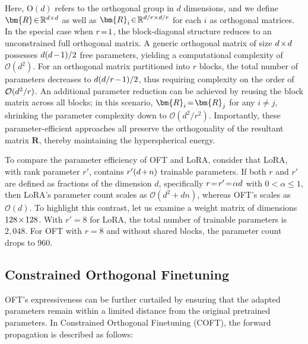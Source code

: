 Here, $\text{O}(d)$ refers to the orthogonal group in $d$ dimensions, and we define $\thickmuskip=2mu \medmuskip=2mu \bm{R}\in\mathbb{R}^{d\times d}$ as well as $\thickmuskip=2mu \medmuskip=2mu \bm{R}_i\in\mathbb{R}^{d/r\times d/r}$ for each $i$ as orthogonal matrices. In the special case when $\thickmuskip=2mu \medmuskip=2mu r=1$, the block-diagonal structure reduces to an unconstrained full orthogonal matrix. A generic orthogonal matrix of size $\thickmuskip=2mu \medmuskip=2mu d\times d$ possesses $\thickmuskip=2mu \medmuskip=2mu d(d-1)/2$ free parameters, yielding a computational complexity of $\mathcal{O}(d^2)$. For an orthogonal matrix partitioned into $r$ blocks, the total number of parameters decreases to $\thickmuskip=2mu \medmuskip=2mu d(d/r-1)/2$, thus requiring complexity on the order of $\thickmuskip=2mu \medmuskip=2mu \mathcal{O}(d^2/r)$. An additional parameter reduction can be achieved by reusing the block matrix across all blocks; in this scenario, $\thickmuskip=2mu \medmuskip=2mu\bm{R}_i=\bm{R}_j$ for any $i\neq j$, shrinking the parameter complexity down to $\mathcal{O}(d^2/r^2)$. Importantly, these parameter-efficient approaches all preserve the orthogonality of the resultant matrix $\bm{R}$, thereby maintaining the hyperspherical energy.

To compare the parameter efficiency of OFT and LoRA, consider that LoRA, with rank parameter $r'$, contains $\thickmuskip=2mu \medmuskip=2mu r'(d+n)$ trainable parameters. If both $r$ and $r'$ are defined as fractions of the dimension $d$, specifically $\thickmuskip=2mu \medmuskip=2mu r=r'=\alpha d$ with $0<\alpha\leq 1$, then LoRA's parameter count scales as $\mathcal{O}(d^2+dn)$, whereas OFT’s scales as $\mathcal{O}(d)$. To highlight this contrast, let us examine a weight matrix of dimensions $\thickmuskip=2mu \medmuskip=2mu 128\times 128$. With $r'=8$ for LoRA, the total number of trainable parameters is $2,048$. For OFT with $r=8$ and without shared blocks, the parameter count drops to $960$.

\subsection{Constrained Orthogonal Finetuning}

OFT’s expressiveness can be further curtailed by ensuring that the adapted parameters remain within a limited distance from the original pretrained parameters. In Constrained Orthogonal Finetuning (COFT), the forward propagation is described as follows:

